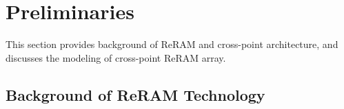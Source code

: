 \section{Preliminaries}\label{sec:preliminary}

This section provides background of ReRAM and cross-point architecture,
and discusses the modeling of cross-point ReRAM array.

\vspace{-5pt}
\subsection{Background of ReRAM Technology}
%

